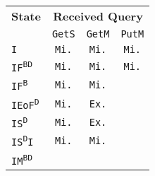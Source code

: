 \begin{tabular}{|l||c|c|c|}
 \hline

 \textbf{State}
 & \multicolumn{3}{c|}{\textbf{Received Query}}
 \\

 & \texttt{GetS} & \texttt{GetM} & \texttt{PutM}
 \\
 \hline

 \texttt{I}

 & \cellcolor{olive!80}\texttt{Mi.}
 & \cellcolor{olive!80}\texttt{Mi.}
 & \cellcolor{olive!80}\texttt{Mi.}
 \\
 \hline

 \texttt{IF\textsuperscript{BD}}

 & \cellcolor{olive!80}\texttt{Mi.}
 & \cellcolor{olive!80}\texttt{Mi.}
 & \cellcolor{olive!80}\texttt{Mi.}
 \\
 \hline

 \texttt{IF\textsuperscript{B}}

 & \cellcolor{olive!80}\texttt{Mi.}
 & \cellcolor{olive!80}\texttt{Mi.}
 & \cellcolor{black!40}
 \\
 \hline

 \texttt{IEoF\textsuperscript{D}}

 & \cellcolor{olive!80}\texttt{Mi.}
 & \cellcolor{orange!60}\texttt{Ex.}
 & \cellcolor{black!40}
 \\
 \hline

 \texttt{IS\textsuperscript{D}}

 & \cellcolor{olive!80}\texttt{Mi.}
 & \cellcolor{orange!60}\texttt{Ex.}
 & \cellcolor{black!40}
 \\
 \hline

 \texttt{IS\textsuperscript{D}I}

 & \cellcolor{olive!80}\texttt{Mi.}
 & \cellcolor{olive!80}\texttt{Mi.}
 & \cellcolor{black!40}
 \\
 \hline

 \texttt{IM\textsuperscript{BD}}


\end{tabular}
